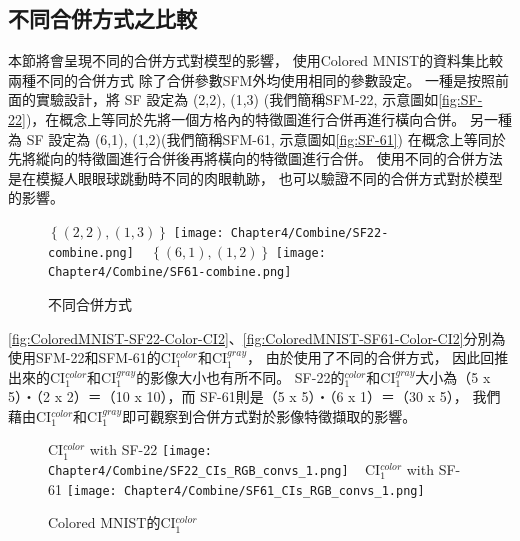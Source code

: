 \documentclass[class=NCU\_thesis, crop=false]{standalone}
\begin{document}
    \pagebreak

    \subsection{不同合併方式之比較}
    本節將會呈現不同的合併方式對模型的影響，
    使用Colored MNIST的資料集比較兩種不同的合併方式
    除了合併參數SFM外均使用相同的參數設定。
    一種是按照前面的實驗設計，將 SF 設定為 {(2,2), (1,3)}
    (我們簡稱SFM-22, 示意圖如\cref{fig:SF-22})，在概念上等同於先將一個方格內的特徵圖進行合併再進行橫向合併。
    另一種為 SF 設定為 {(6,1), (1,2)}(我們簡稱SFM-61, 示意圖如\cref{fig:SF-61})
    在概念上等同於先將縱向的特徵圖進行合併後再將橫向的特徵圖進行合併。
    使用不同的合併方法是在模擬人眼眼球跳動時不同的肉眼軌跡，
    也可以驗證不同的合併方式對於模型的影響。

    \begin{figure}[H]
        \subcaptionbox
            {$\left\{(2, 2), (1, 3)\right\}$
            \label{fig:SF-22}}
            {\texttt{[image: Chapter4/Combine/SF22-combine.png]}}
        ~
        \subcaptionbox
            {$\left\{(6, 1), (1, 2)\right\}$
            \label{fig:SF-61}}
            {\texttt{[image: Chapter4/Combine/SF61-combine.png]}}
        ~
        \caption{不同合併方式}
        \label{fig:SF}
    \end{figure}

	\cref{fig:ColoredMNIST-SF22-Color-CI2}、\cref{fig:ColoredMNIST-SF61-Color-CI2}分別為使用SFM-22和SFM-61的CI$^{color}_{1}$和CI$^{gray}_{1}$，
	由於使用了不同的合併方式，
	因此回推出來的CI$^{color}_{1}$和CI$^{gray}_{1}$的影像大小也有所不同。
	SF-22的$^{color}_{1}$和CI$^{gray}_{1}$大小為（5 x 5）‧（2 x 2）＝（10 x 10），而
    SF-61則是（5 x 5）‧（6 x 1）＝（30 x 5），
    我們藉由CI$^{color}_{1}$和CI$^{gray}_{1}$即可觀察到合併方式對於影像特徵擷取的影響。

    \begin{figure}[H]
        \centering
        \subcaptionbox
            {CI$^{color}_{1}$ with SF-22
            \label{fig:ColoredMNIST-SF22-Color-CI2}}
            {\texttt{[image: Chapter4/Combine/SF22\_CIs\_RGB\_convs\_1.png]}}
        ~
        \subcaptionbox
            {CI$^{color}_{1}$ with SF-61
            \label{fig:ColoredMNIST-SF61-Color-CI2}}
            {\texttt{[image: Chapter4/Combine/SF61\_CIs\_RGB\_convs\_1.png]}}
        ~
        \caption{Colored MNIST的CI$^{color}_{1}$}
        \label{fig:ColoredMNIST-Color-CI2}
    \end{figure}
\end{document}
